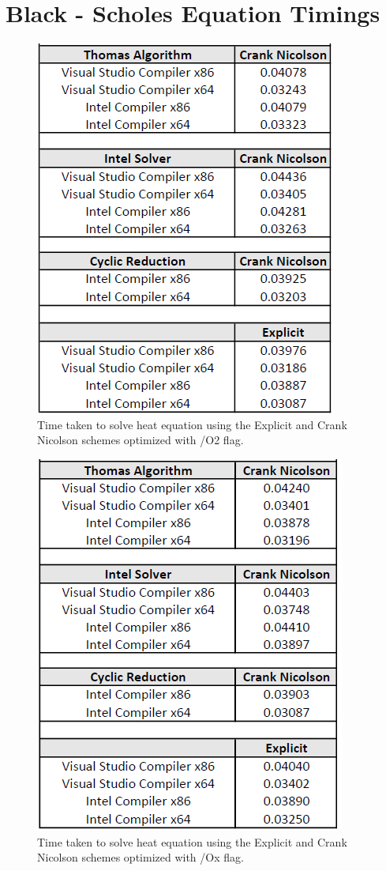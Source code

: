 \documentclass[12pt, oneside]{book}
\theoremstyle{plain}
\theoremstyle{definition}
\begin{document}
\chapter{Black - Scholes Equation Timings}\label{bsTime}
\begin{figure}[!htb]
    \centering
        \includegraphics[scale=0.7]{bs2Optimized.png}
    \caption{Time taken to solve heat equation using the Explicit and Crank Nicolson schemes  optimized with /O2 flag.}
\end{figure}
\begin{figure}[!htb]
    \centering
        \includegraphics[scale=0.6]{bsXOptimized.png}
    \caption{Time taken to solve heat equation using the Explicit and Crank Nicolson schemes  optimized with /Ox flag.}
\end{figure}




\end{document}

